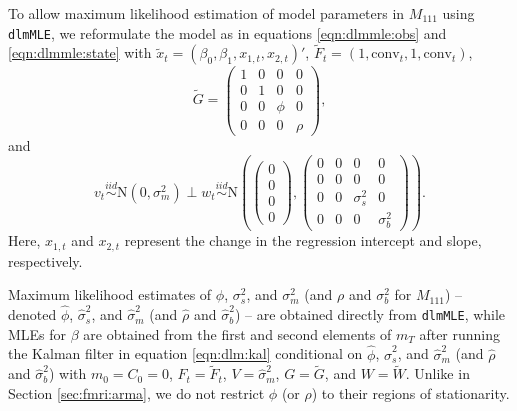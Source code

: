To allow maximum likelihood estimation of model parameters in $M_{111}$ using {\tt dlmMLE}, we reformulate the model as in equations \eqref{eqn:dlmmle:obs} and \eqref{eqn:dlmmle:state} with $\tilde{x}_t = (\beta_0,\beta_1,x_{1,t},x_{2,t})'$, $\tilde{F}_t = (1,\mbox{conv}_t,1,\mbox{conv}_t)$,
\[\tilde{G} = \left(\begin{array}{cccc} 1 & 0 & 0 & 0 \\ 0 & 1 & 0 & 0 \\ 0 & 0 & \phi & 0 \\ 0 & 0 & 0 & \rho \end{array}\right), \]
and \[v_t \stackrel{iid}{\sim} \mbox{N}(0,\sigma^2_m) \perp w_t \stackrel{iid}{\sim} \mbox{N}\left(\left(\begin{array}{c} 0 \\ 0 \\ 0 \\ 0 \end{array}\right), \left(\begin{array}{cccc} 0 & 0 & 0 & 0 \\ 0 & 0 & 0 & 0 \\ 0 & 0 & \sigma^2_s & 0 \\  0 & 0 & 0 & \sigma^2_b \end{array}\right)\right).\]
Here, $x_{1,t}$ and $x_{2,t}$ represent the change in the regression intercept and slope, respectively.

Maximum likelihood estimates of $\phi$, $\sigma^2_s$, and $\sigma^2_m$ (and $\rho$ and $\sigma^2_b$ for $M_{111}$) -- denoted $\hat{\phi}$, $\hat{\sigma}^2_s$, and $\hat{\sigma}^2_m$ (and $\hat{\rho}$ and $\hat{\sigma}^2_b$) -- are obtained directly from {\tt dlmMLE}, while MLEs for $\beta$ are obtained from the first and second elements of $m_T$ after running the Kalman filter in equation \eqref{eqn:dlm:kal} conditional on $\hat{\phi}$, $\hat{\sigma}^2_s$, and $\hat{\sigma}^2_m$ (and $\hat{\rho}$ and $\hat{\sigma}^2_b$) with $m_0 = C_0 = 0$, $F_t = \tilde{F}_t$, $V = \hat{\sigma}^2_m$, $G = \tilde{G}$, and $W = \tilde{W}$. Unlike in Section \ref{sec:fmri:arma}, we do not restrict $\phi$ (or $\rho$) to their regions of stationarity.

